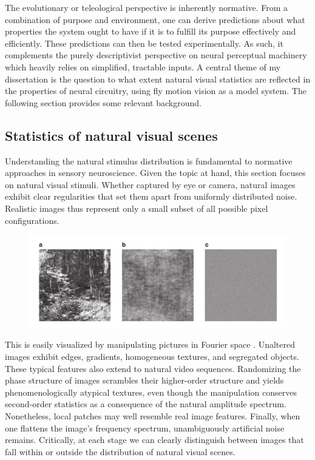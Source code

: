 The evolutionary or teleological perspective is inherently normative. From a combination of purpose and environment, one can derive predictions about what properties the system ought to have if it is to fulfill its purpose effectively and efficiently. These predictions can then be tested experimentally. As such, it complements the purely descriptivist perspective on neural perceptual machinery which heavily relies on simplified, tractable inputs. A central theme of my dissertation is the question to what extent natural visual statistics are reflected in the properties of neural circuitry, using fly motion vision as a model system. The following section provides some relevant background.

\subsection{Statistics of natural visual scenes} Understanding the natural stimulus distribution is fundamental to normative approaches in sensory neuroscience. Given the topic at hand, this section focuses on natural visual stimuli. Whether captured by eye or camera, natural images exhibit clear regularities that set them apart from uniformly distributed noise. Realistic images thus represent only a small subset of all possible pixel configurations.

\begin{figure}
    \centering
    \includegraphics[width=1\textwidth]{graphics/figure1_reduced}
    \caption[bla]{}
    \label{fig:my_label}
\end{figure}

This is easily visualized by manipulating pictures in Fourier space \citep{Hyvarinen:2009hf}. Unaltered images exhibit edges, gradients, homogeneous textures, and segregated objects. These typical features also extend to natural video sequences. Randomizing the phase structure of images scrambles their higher-order structure and yields phenomenologically atypical textures, even though the manipulation conserves second-order statistics as a consequence of the natural amplitude spectrum. Nonetheless, local patches may well resemble real image features. Finally, when one flattens the image's frequency spectrum, unambiguously artificial noise remains. Critically, at each stage we can clearly distinguish between images that fall within or outside the distribution of natural visual scenes.


